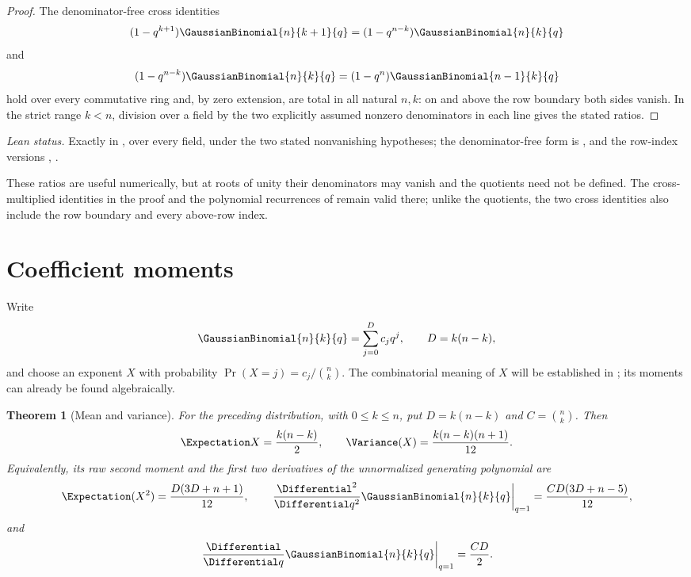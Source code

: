 \documentclass[11pt,a4paper,oneside,openany]{book}
\newtheorem{theorem}{Theorem}[chapter]
\theoremstyle{definition}
\theoremstyle{remark}
\begin{document}
\begin{proof}
The denominator-free cross identities
\[
 (1-q^{k+1})\GaussianBinomial{n}{k+1}{q}
 =(1-q^{n-k})\GaussianBinomial{n}{k}{q}
\]
and
\[
 (1-q^{n-k})\GaussianBinomial{n}{k}{q}
 =(1-q^n)\GaussianBinomial{n-1}{k}{q}
\]
hold over every commutative ring and, by zero extension, are total in all
natural \(n,k\): on and above the row boundary both sides vanish.  In the
strict range \(k<n\), division over a field by the two explicitly assumed
nonzero denominators in each line gives the stated ratios.
\end{proof}

\emph{Lean status.}  Exactly  in
, over every field, under the two stated
nonvanishing hypotheses; the denominator-free form is
, and the row-index versions
, .


These ratios are useful numerically, but at roots of unity their denominators
may vanish and the quotients need not be defined.  The cross-multiplied
identities in the proof and the polynomial recurrences of
 remain valid there; unlike the quotients, the two cross
identities also include the row boundary and every above-row index.

\section{Coefficient moments}

Write
\[
 \GaussianBinomial{n}{k}{q}=\sum_{j=0}^{D}c_jq^j,
 \qquad D=k(n-k),
\]
and choose an exponent $X$ with probability
\(
 \Pr(X=j)=c_j/\binom nk.
\)
The combinatorial meaning of $X$ will be established in ; its moments can already be found algebraically.

\begin{theorem}[Mean and variance]\label{thm:qbinom-moments}
For the preceding distribution, with $0\le k\le n$, put
$D=k(n-k)$ and $C=\binom nk$.  Then
\[
 \Expectation X=\frac{k(n-k)}2,
 \qquad
 \Variance(X)=\frac{k(n-k)(n+1)}{12}.
\]
Equivalently, its raw second moment and the first two derivatives of the
unnormalized generating polynomial are
\[
 \Expectation(X^2)=\frac{D(3D+n+1)}{12},
 \qquad
 \left.\frac{\Differential^2}{\Differential q^2}
   \GaussianBinomial{n}{k}{q}\right|_{q=1}
 =\frac{CD(3D+n-5)}{12},
\]
and
\[
 \left.\frac{\Differential}{\Differential q}\GaussianBinomial{n}{k}{q}\right|_{q=1}
 =\frac{CD}{2}.
\]
\end{theorem}
\end{document}

